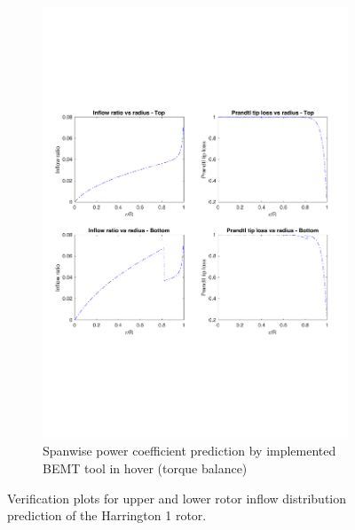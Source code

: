 \begin{figure}[H]
\begin{subfigure}[t]{0.5\textwidth}
    \includegraphics[width=\textwidth]{Figures/verification_inflow.pdf}
    \caption{Spanwise power coefficient prediction by implemented BEMT tool in hover (torque balance)}
    \label{fig:disks}
\end{subfigure}
    \captionsetup{justification=centering}
    \caption{Verification plots for upper and lower rotor inflow distribution prediction of the Harrington 1 rotor.}
    \label{fig:BEMT}
\end{figure}

